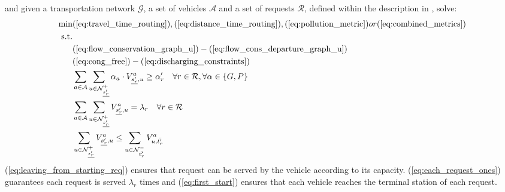  and given a transportation network $\mathcal{G}$, a set of vehicles $\mathcal{A}$ and a set of requests $\mathcal{R}$, defined within the description in , solve:\\
\begin{align}
	\text{min}&  
		(\ref{eq:travel_time_routing}), (\ref{eq:distance_time_routing}), (\ref{eq:pollution_metric}) or (\ref{eq:combined_metrics})
	\nonumber\\
	\text{s.t.} &\nonumber\\
	&(\ref{eq:flow_conservation_graph_u})-(\ref{eq:flow_cons_departure_graph_u})\nonumber\\
	&(\ref{eq:cong_free})-(\ref{eq:discharging_constraints})\nonumber\\
	&\sum_{ a \in \mathcal{A} }
	\sum_{u \in \mathcal{N}^+_{\underline{s'_r}} } \alpha_a \cdot V^a_{ \underline{s'_r}, u} \ge \alpha'_r \quad \forall r \in \mathcal{R}, \forall \alpha \in \{G, P\}	\label{eq:leaving_from_starting_req}\\
	&\sum_{ a \in \mathcal{A} }\sum_{u \in \mathcal{N}^+_{\underline{s'_r}} } V^a_{ \underline{s'_r}, u} =\lambda_r\quad \forall r \in \mathcal{R}	\label{eq:each_request_ones}\\
	&\sum_{u \in \mathcal{N}^+_{\underline{s'_r}} }  V^a_{ \underline{s'_r}, u} \leq \sum_{u \in \mathcal{N}^-_{\bar{t'_r}} }  V^a_{u,\bar{t'_r}} \label{eq:first_start}
\end{align}
(\ref{eq:leaving_from_starting_req}) ensures that request can be served by the vehicle according to its capacity. (\ref{eq:each_request_ones}) guarantees each request is served $\lambda_r$ times and (\ref{eq:first_start}) ensures that each vehicle reaches the terminal station of each request. 
\fi

